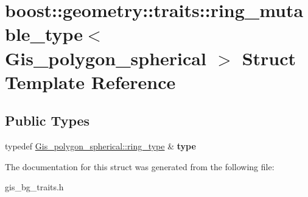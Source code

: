 \hypertarget{structboost_1_1geometry_1_1traits_1_1ring__mutable__type_3_01Gis__polygon__spherical_01_4}{}\section{boost\+:\+:geometry\+:\+:traits\+:\+:ring\+\_\+mutable\+\_\+type$<$ Gis\+\_\+polygon\+\_\+spherical $>$ Struct Template Reference}
\label{structboost_1_1geometry_1_1traits_1_1ring__mutable__type_3_01Gis__polygon__spherical_01_4}
\subsection*{Public Types}
\begin{DoxyCompactItemize}
\item 
\mbox{\label{structboost_1_1geometry_1_1traits_1_1ring__mutable__type_3_01Gis__polygon__spherical_01_4_aac1eeec9f015f20821b0ed9992c08020}} 
typedef \mbox{\hyperlink{classGis__polygon__ring__spherical}{Gis\+\_\+polygon\+\_\+spherical\+::ring\+\_\+type}} \& {\bfseries type}
\end{DoxyCompactItemize}


The documentation for this struct was generated from the following file\+:\begin{DoxyCompactItemize}
\item 
gis\+\_\+bg\+\_\+traits.\+h\end{DoxyCompactItemize}
